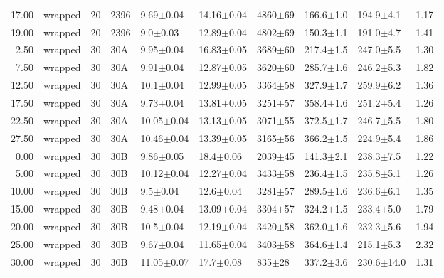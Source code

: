 \begin{table}
\begin{tabular}{rlrllllllr}
     17.00 &       wrapped &      20 &    2396 &        9.69$\pm$0.04 &   14.16$\pm$0.04 &  4860$\pm$69 &   166.6$\pm$1.0 &   194.9$\pm$4.1 &        1.17 \\
     19.00 &       wrapped &      20 &    2396 &         9.0$\pm$0.03 &   12.89$\pm$0.04 &  4802$\pm$69 &   150.3$\pm$1.1 &   191.0$\pm$4.7 &        1.41 \\
      2.50 &       wrapped &      30 &     30A &        9.95$\pm$0.04 &   16.83$\pm$0.05 &  3689$\pm$60 &   217.4$\pm$1.5 &   247.0$\pm$5.5 &        1.30 \\
      7.50 &       wrapped &      30 &     30A &        9.91$\pm$0.04 &   12.87$\pm$0.05 &  3620$\pm$60 &   285.7$\pm$1.6 &   246.2$\pm$5.3 &        1.82 \\
     12.50 &       wrapped &      30 &     30A &        10.1$\pm$0.04 &   12.99$\pm$0.05 &  3364$\pm$58 &   327.9$\pm$1.7 &   259.9$\pm$6.2 &        1.36 \\
     17.50 &       wrapped &      30 &     30A &        9.73$\pm$0.04 &   13.81$\pm$0.05 &  3251$\pm$57 &   358.4$\pm$1.6 &   251.2$\pm$5.4 &        1.26 \\
     22.50 &       wrapped &      30 &     30A &       10.05$\pm$0.04 &   13.13$\pm$0.05 &  3071$\pm$55 &   372.5$\pm$1.7 &   246.7$\pm$5.5 &        1.80 \\
     27.50 &       wrapped &      30 &     30A &       10.46$\pm$0.04 &   13.39$\pm$0.05 &  3165$\pm$56 &   366.2$\pm$1.5 &   224.9$\pm$5.4 &        1.86 \\
      0.00 &       wrapped &      30 &     30B &        9.86$\pm$0.05 &    18.4$\pm$0.06 &  2039$\pm$45 &   141.3$\pm$2.1 &   238.3$\pm$7.5 &        1.22 \\
      5.00 &       wrapped &      30 &     30B &       10.12$\pm$0.04 &   12.27$\pm$0.04 &  3433$\pm$58 &   236.4$\pm$1.5 &   235.8$\pm$5.1 &        1.26 \\
     10.00 &       wrapped &      30 &     30B &         9.5$\pm$0.04 &    12.6$\pm$0.04 &  3281$\pm$57 &   289.5$\pm$1.6 &   236.6$\pm$6.1 &        1.35 \\
     15.00 &       wrapped &      30 &     30B &        9.48$\pm$0.04 &   13.09$\pm$0.04 &  3304$\pm$57 &   324.2$\pm$1.5 &   233.4$\pm$5.0 &        1.79 \\
     20.00 &       wrapped &      30 &     30B &        10.5$\pm$0.04 &   12.19$\pm$0.04 &  3420$\pm$58 &   362.0$\pm$1.6 &   232.3$\pm$5.6 &        1.94 \\
     25.00 &       wrapped &      30 &     30B &        9.67$\pm$0.04 &   11.65$\pm$0.04 &  3403$\pm$58 &   364.6$\pm$1.4 &   215.1$\pm$5.3 &        2.32 \\
     30.00 &       wrapped &      30 &     30B &       11.05$\pm$0.07 &    17.7$\pm$0.08 &   835$\pm$28 &   337.2$\pm$3.6 &  230.6$\pm$14.0 &        1.31 \\
\hline
\end{tabular}
\end{table}